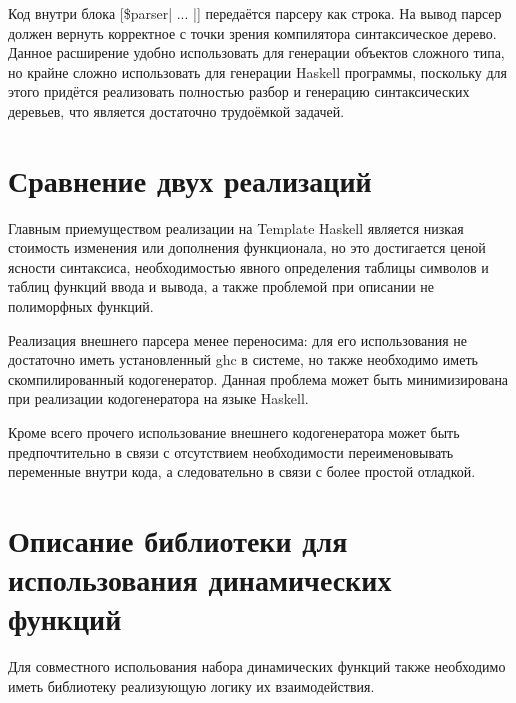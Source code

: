 \begin{code}
\end{code} %
Код внутри блока [\$parser| ... |] передаётся парсеру как строка. На
вывод парсер должен вернуть корректное с точки зрения компилятора
синтаксическое дерево. Данное расширение удобно использовать для
генерации объектов сложного типа, но крайне сложно использовать для
генерации Haskell программы, поскольку для этого придётся реализовать
полностью разбор и генерацию синтаксических деревьев, что является
достаточно трудоёмкой задачей. 

\section{Сравнение двух реализаций}

Главным приемуществом реализации на Template Haskell является низкая
стоимость изменения или дополнения функционала, но это достигается
ценой ясности синтаксиса, необходимостью явного определения таблицы
символов и таблиц функций ввода и вывода, а также проблемой при
описании не полиморфных функций.

Реализация внешнего парсера менее переносима: для его использования не
достаточно иметь установленный ghc в системе, но также необходимо
иметь скомпилированный кодогенератор. Данная проблема может быть
минимизирована при реализации кодогенератора на языке Haskell. 

Кроме всего прочего использование внешнего кодогенератора может быть
предпочтительно в связи с отсутствием необходимости переименовывать
переменные внутри кода, а следовательно в связи с более простой
отладкой.

\section{Описание библиотеки для использования динамических функций}

Для совместного испольования набора динамических функций также
необходимо иметь библиотеку реализующую логику их взаимодействия.

